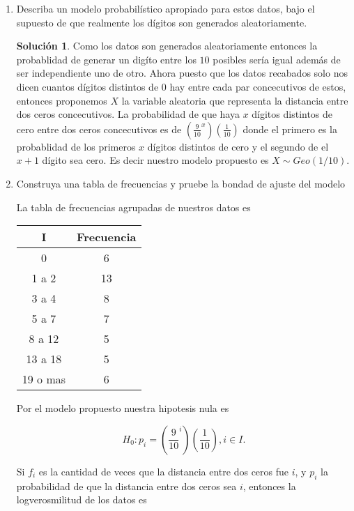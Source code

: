 \documentclass[letterpaper]{article}
\theoremstyle{definition}
\theoremstyle{lemathm}
\theoremstyle{lemathm}
\newtheorem{sol}{Solución}
\theoremstyle{lemathm}
\theoremstyle{lemademthm}
\newcommand{\pars}[1]{\left( #1 \right) }
\newcommand{\1}{\mathbbm{1}}
\begin{document}
	\begin{enumerate}
		\item Describa un modelo probabilístico apropiado para estos datos, bajo el supuesto de que realmente los dígitos son generados aleatoriamente.
  		
		\begin{sol}

		Como los datos son generados aleatoriamente entonces la probablidad de generar un digíto entre los $10$ posibles sería igual además de ser independiente uno de otro. Ahora puesto que los datos recabados solo nos dicen cuantos dígitos distintos de $0$ hay entre cada par concecutivos de estos, entonces proponemos $X$ la variable aleatoria que representa la distancia entre dos ceros concecutivos. La probabilidad de que haya $x$ dígitos distintos de cero entre dos ceros concecutivos es de $\pars{\frac{9}{10}^x}\pars{\frac{1}{10}}$ donde el primero es la probablidad de los primeros $x$ dígitos distintos de cero y el segundo de el $x+1$ dígito sea cero. Es decir nuestro modelo propuesto es $X \sim Geo(1/10)$.
		\end{sol}

		\newpage

		\item Construya una tabla de frecuencias y pruebe la bondad de ajuste del modelo
		
		La tabla de frecuencias agrupadas de nuestros datos es

		\begin{table*}[h!]
			\centering
			\begin{tabular}{|c|c|}
				\hline
				I & Frecuencia\\
				\hline
				0 & 6\\
				1 a 2 & 13\\
				3 a 4 & 8\\
				5 a 7 & 7\\
				8 a 12 & 5\\
				13 a 18 & 5\\
				19 o mas & 6\\
				\hline
			\end{tabular}
		\end{table*}

		Por el modelo propuesto nuestra hipotesis nula es

		\[H_0: p_i = \pars{\frac{9}{10}^i}\pars{\frac{1}{10}}, i \in I.\]

		Si $f_i$ es la cantidad de veces que la distancia entre dos ceros fue $i$, y $p_i$ la probabilidad de que la distancia entre dos ceros sea $i$, entonces la logverosmilitud de los datos es


\end{enumerate}
\end{document}
